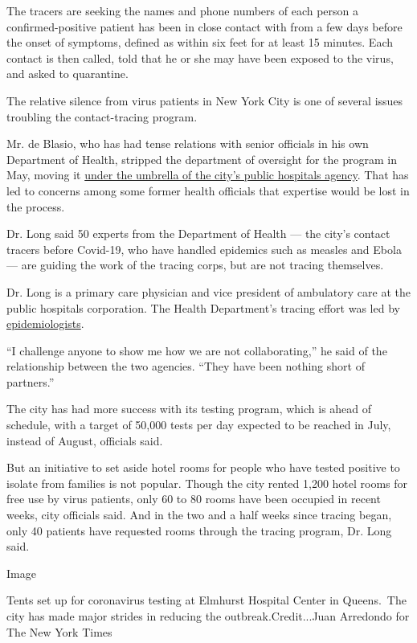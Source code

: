 The tracers are seeking the names and phone numbers of each person a
confirmed-positive patient has been in close contact with from a few
days before the onset of symptoms, defined as within six feet for at
least 15 minutes. Each contact is then called, told that he or she may
have been exposed to the virus, and asked to quarantine.

The relative silence from virus patients in New York City is one of
several issues troubling the contact-tracing program.

Mr. de Blasio, who has had tense relations with senior officials in his
own Department of Health, stripped the department of oversight for the
program in May, moving it
\href{https://www.nytimes.com/2020/05/07/nyregion/coronavirus-contact-tracing-nyc.html}{under
the umbrella of the city's public hospitals agency}. That has led to
concerns among some former health officials that expertise would be lost
in the process.

Dr. Long said 50 experts from the Department of Health --- the city's
contact tracers before Covid-19, who have handled epidemics such as
measles and Ebola --- are guiding the work of the tracing corps, but are
not tracing themselves.

Dr. Long is a primary care physician and vice president of ambulatory
care at the public hospitals corporation. The Health Department's
tracing effort was led by
\href{https://www.publichealth.columbia.edu/people/our-faculty/sa3217}{epidemiologists}.

``I challenge anyone to show me how we are not collaborating,'' he said
of the relationship between the two agencies. ``They have been nothing
short of partners.''

The city has had more success with its testing program, which is ahead
of schedule, with a target of 50,000 tests per day expected to be
reached in July, instead of August, officials said.

But an initiative to set aside hotel rooms for people who have tested
positive to isolate from families is not popular. Though the city rented
1,200 hotel rooms for free use by virus patients, only 60 to 80 rooms
have been occupied in recent weeks, city officials said. And in the two
and a half weeks since tracing began, only 40 patients have requested
rooms through the tracing program, Dr. Long said.

Image

Tents set up for coronavirus testing at Elmhurst Hospital Center in
Queens.~The city has made major strides in reducing the
outbreak.Credit...Juan Arredondo for The New York Times

